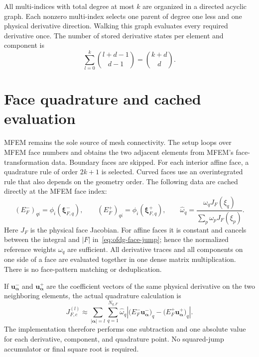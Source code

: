 All multi-indices with total degree at most $k$ are organized in a directed
acyclic graph.  Each nonzero multi-index selects one parent of degree one less and
one physical derivative direction.  Walking this graph evaluates every required
derivative once.  The number of stored derivative states per element and component
is
\begin{equation}
  \sum_{l=0}^k\binom{l+d-1}{d-1}=\binom{k+d}{d}.
\end{equation}

\section{Face quadrature and cached evaluation}

MFEM remains the sole source of mesh connectivity.  The setup loops over MFEM
face numbers and obtains the two adjacent elements from MFEM's face-transformation
data.  Boundary faces are skipped.  For each
interior affine face, a quadrature rule of order $2k+1$ is selected.  Curved
faces use an overintegrated rule that also depends on the geometry order.  The following data are cached directly at the MFEM face index:
\begin{equation}
  (E_F^-)_{qi}=\phi_i(\boldsymbol{\xi}_{F,q}^-),
  \qquad
  (E_F^+)_{qi}=\phi_i(\boldsymbol{\xi}_{F,q}^+),
  \qquad
  \widehat{\omega}_q=\frac{\omega_q J_F(\xi_q)}{\sum_p\omega_p J_F(\xi_p)}.
  \label{eq:ofdg-face-evaluation-matrices}
\end{equation}
Here $J_F$ is the physical face Jacobian.  For affine faces it is constant and cancels between the
integral and $|F|$ in~\eqref{eq:ofdg-face-jump}; hence the normalized reference
weights $\widehat{\omega}_q$ are sufficient.  All derivative traces and all
components on one side of a face are evaluated together in one dense matrix
multiplication.  There is no face-pattern matching or deduplication.

If $\boldsymbol{u}_{\boldsymbol{\alpha}}^-$ and
$\boldsymbol{u}_{\boldsymbol{\alpha}}^+$ are the coefficient vectors of the
same physical derivative on the two neighboring elements, the actual quadrature
calculation is
\begin{equation}
  J_{F,c}^{(l)}
  \approx\sum_{|\boldsymbol{\alpha}|=l}\sum_{q=1}^{N_{q,F}}
  \widehat{\omega}_q
  \left|
    \bigl(E_F^-\boldsymbol{u}_{\boldsymbol{\alpha}}^-\bigr)_q
    -\bigl(E_F^+\boldsymbol{u}_{\boldsymbol{\alpha}}^+\bigr)_q
  \right|.
  \label{eq:ofdg-discrete-face-jump}
\end{equation}
The implementation therefore performs one subtraction and one absolute value for
each derivative, component, and quadrature point.  No squared-jump accumulator or
final square root is required.

